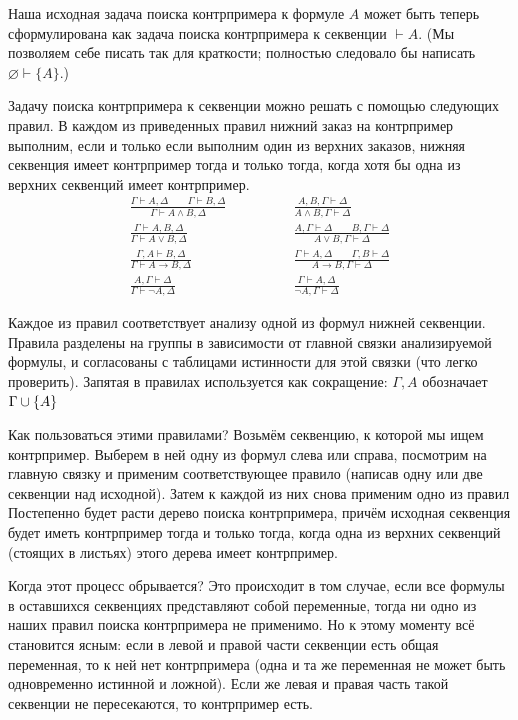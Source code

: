 Наша исходная задача поиска контрпримера к формуле $A$ может
быть теперь сформулирована как задача поиска контрпримера к
секвенции $\vdash A$. (Мы позволяем себе писать так для
краткости; полностью следовало бы написать
$\varnothing\vdash\{A\}$.)

Задачу поиска контрпримера к
секвенции можно решать с помощью следующих правил. В каждом из
приведенных правил нижний заказ на контрпример выполним, если и
только если выполним один из верхних заказов,  нижняя секвенция
имеет контрпример тогда и только тогда, когда хотя бы
одна из верхних секвенций имеет контрпример.
\begin{align*}
\frac{\Gamma\vdash A,\Delta\qquad \Gamma\vdash B,\Delta}
{\Gamma\vdash A\wedge B,\Delta}
        \qquad&\qquad
\frac{A,B,\Gamma\vdash\Delta}
{A\wedge B,\Gamma\vdash\Delta}
        \\[0.7ex]
\frac{\Gamma\vdash A, B,\Delta}
{\Gamma\vdash A\vee B,\Delta}
        \qquad&\qquad
\frac{A,\Gamma\vdash \Delta\qquad B,\Gamma\vdash \Delta}
{A\vee B,\Gamma\vdash \Delta}
        \\[0.7ex]
\frac{\Gamma,A\vdash  B,\Delta}
{\Gamma\vdash A\to B,\Delta}
        \qquad&\qquad
\frac{\Gamma\vdash A,\Delta\qquad \Gamma,B\vdash\Delta}
{A\to B,\Gamma\vdash \Delta}
        \\[0.7ex]
\frac{A,\Gamma\vdash \Delta}
{\Gamma\vdash \neg A,\Delta}
        \qquad&\qquad
\frac{\Gamma\vdash A,\Delta}
{\neg A,\Gamma\vdash \Delta}
\end{align*}

\noindent
Каждое из правил соответствует анализу одной из формул нижней
секвенции. Правила разделены на группы в зависимости от главной
связки анализируемой формулы, и согласованы с таблицами
истинности для этой связки (что легко проверить). Запятая в
правилах используется как сокращение: $\Gamma,A$ обозначает
$\Gamma\hm\cup\{A\}$ 

Как пользоваться этими правилами? Возьмём секвенцию,
к которой мы ищем контрпример. Выберем в ней одну
из формул слева или справа, посмотрим на главную
связку и применим соответствующее правило (написав
одну или две секвенции над исходной). Затем к каждой
из них снова применим одно из правил  Постепенно
будет расти  дерево поиска контрпримера, причём
исходная секвенция будет иметь контрпример тогда и
только тогда, когда одна из верхних секвенций
(стоящих в  листьях) этого дерева имеет
контрпример.

Когда этот процесс обрывается? Это происходит в
том случае, если все формулы в оставшихся секвенциях
представляют собой переменные, тогда ни одно из
наших правил поиска контрпримера не применимо. Но
к этому моменту всё становится ясным: если в левой
и правой части секвенции есть общая переменная,
то к ней нет контрпримера (одна и та же переменная
не может быть одновременно истинной и ложной). Если
же левая и правая часть такой секвенции не
пересекаются, то контрпример есть.

